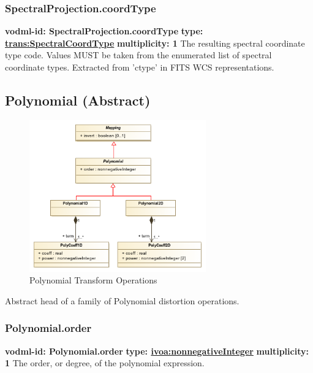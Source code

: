     \subsubsection{SpectralProjection.coordType}
      \textbf{vodml-id: SpectralProjection.coordType} \newline
      \textbf{type: \hyperref[sect:SpectralCoordType]{trans:SpectralCoordType}} \newline
      \textbf{multiplicity: 1} \newline 
      The resulting spectral coordinate type code. Values MUST be taken from the enumerated list of spectral coordinate types. Extracted from 'ctype' in FITS WCS representations.

  \subsection{Polynomial (Abstract)}
  \label{sect:Polynomial}
    \begin{figure}[h]
    \begin{center}
      \includegraphics[width=3in]{diagrams/polynomial_operations.png}
      \caption{Polynomial Transform Operations}\label{fig:PolyOps}
    \end{center}
    \end{figure}

    Abstract head of a family of Polynomial distortion operations.

    \subsubsection{Polynomial.order}
      \textbf{vodml-id: Polynomial.order} \newline
      \textbf{type: \hyperref[sect:ivoa]{ivoa:nonnegativeInteger}} \newline
      \textbf{multiplicity: 1} \newline 
      The order, or degree, of the polynomial expression.

